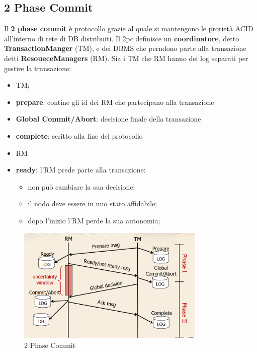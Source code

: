 \documentclass[12pt]{article}
\begin{document}
\subsection{2 Phase Commit} 
Il \textbf{2 phase commit} \`e protocollo grazie al quale si mantengono le proriet\`a ACID all'interno di rete di DB distribuiti. Il 2pc definisce un \textbf{coordinatore}, detto \textbf{TransactionManger} (TM), e dei DBMS che perndono parte alla transazione detti \textbf{ResoueceManagers} (RM). Sia i TM che RM hanno dei log separati per gestire la transazione:
\begin{itemize}
    \item TM;
    \item \textbf{prepare}: contine gli id dei RM che partecipano alla transazione
    \item \textbf{Global Commit/Abort}:  decisione finale della transazione
    \item \textbf{complete}: scritto alla fine del protocollo
\end{itemize}
\begin{itemize}
    \item RM
    \item \textbf{ready}: l'RM prede parte alla transazione: 
     \begin{itemize}
         \item non pu\`o cambiare la sua decisione;
         \item il nodo deve essere in uno stato affidabile;
         \item dopo l'inizio l'RM perde la sua autonomia;
     \end{itemize}
\end{itemize}
\begin{figure}[H]
    \centering
    \includegraphics[width=0.8\textwidth]{2-phase-commit.png}
    \caption{2 Phase Commit}
    \label{fig:2-phase-commit}
\end{figure}
\end{document}
